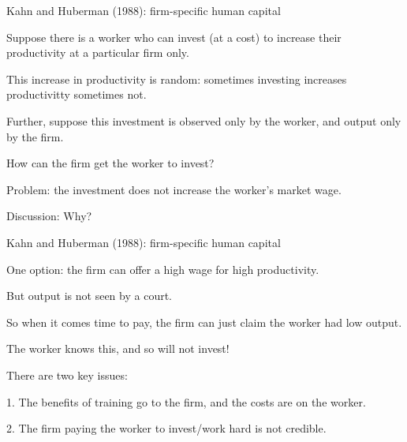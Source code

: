 \documentclass[aspectratio=169,usenames,dvipsnames]{beamer}
\newenvironment{wideitemize}{\itemize\addtolength{\itemsep}{10pt}}{\enditemize}
\begin{document}
\begin{frame}{Kahn and Huberman (1988): firm-specific human capital}

\begin{wideitemize}
    \item Suppose there is a worker who can invest (at a cost) to increase their productivity at a particular firm only.
    \item This increase in productivity is random: sometimes investing increases productivitty sometimes not.
    \item Further, suppose this investment is observed only by the worker, and output only by the firm.
    \item How can the firm get the worker to invest?
    \item Problem: the investment does not increase the worker's market wage.
    \item Discussion: Why?
\end{wideitemize}
    
\end{frame}

\begin{frame}{Kahn and Huberman (1988): firm-specific human capital}

\begin{wideitemize}
    \item One option: the firm can offer a high wage for high productivity.
    \item But output is not seen by a court.
    \item So when it comes time to pay, the firm can just claim the worker had low output.
    \item The worker knows this, and so will not invest!
    \item There are two key issues:
    \begin{wideitemize}
        \item[1.] The benefits of training go to the firm, and the costs are on the worker.
        \item[2.] The firm paying the worker to invest/work hard is not credible.
    \end{wideitemize}
\end{wideitemize}
    
\end{frame}
\end{document}
